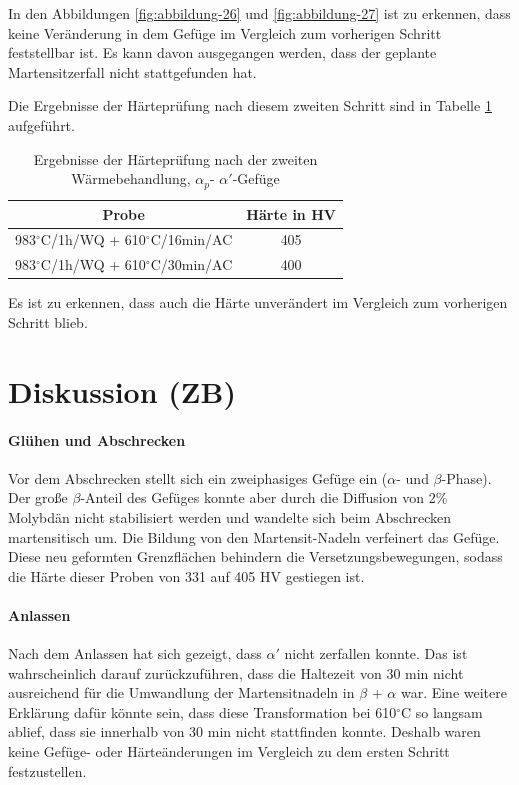 In den Abbildungen \ref{fig:abbildung-26} und \ref{fig:abbildung-27} ist zu erkennen, dass keine Veränderung in dem Gefüge im Vergleich zum vorherigen Schritt feststellbar ist. Es kann davon ausgegangen werden, dass der geplante Martensitzerfall nicht stattgefunden hat.

Die Ergebnisse der Härteprüfung nach diesem zweiten Schritt sind in Tabelle \ref{Tabelle 9} aufgeführt.

\begin{table}[h]
	\centering
	\begin{tabular}{|c|c|}
		\hline 
		Probe & Härte in HV \\ 
		\hline 
		983$^\circ$C/1h/WQ + 610$^\circ$C/16min/AC & 405 \\ 
		\hline 
		983$^\circ$C/1h/WQ + 610$^\circ$C/30min/AC & 400 \\ 
		\hline 
	\end{tabular} 
	\caption{Ergebnisse der Härteprüfung nach der zweiten Wärmebehandlung, $\alpha_p$- $\alpha'$-Gefüge}
	\label{Tabelle 9}
\end{table}

Es ist zu erkennen, dass auch die Härte unverändert im Vergleich zum vorherigen Schritt blieb.

\section{Diskussion (ZB)}

\paragraph{Glühen und Abschrecken}
Vor dem Abschrecken stellt sich ein zweiphasiges Gefüge ein ($\alpha$- und $\beta$-Phase). Der große $\beta$-Anteil des Gefüges konnte aber durch die Diffusion von 2\% Molybdän nicht stabilisiert werden und wandelte sich beim Abschrecken martensitisch um. Die Bildung von den Martensit-Nadeln verfeinert das Gefüge. Diese neu geformten Grenzflächen behindern die Versetzungsbewegungen, sodass die Härte dieser Proben von 331 auf 405 HV gestiegen ist. 

\paragraph{Anlassen} Nach dem Anlassen hat sich gezeigt, dass $\alpha'$ nicht zerfallen konnte. Das ist wahrscheinlich darauf zurückzuführen, dass die Haltezeit von 30 min nicht ausreichend für die Umwandlung der Martensitnadeln in  $\beta$ + $\alpha$ war. Eine weitere Erklärung dafür könnte sein, dass diese Transformation bei 610$^\circ$C so langsam ablief, dass sie innerhalb von 30 min nicht stattfinden konnte.
Deshalb waren keine Gefüge- oder Härteänderungen im Vergleich zu dem ersten Schritt festzustellen. 

